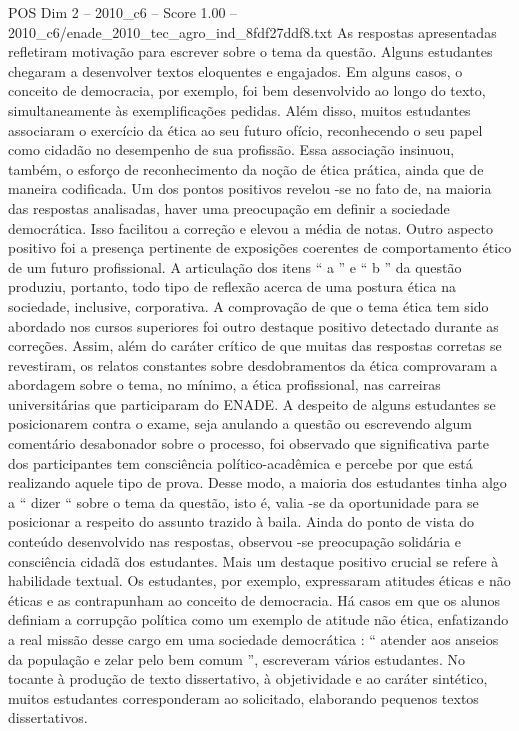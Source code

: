 \begin{textsample}{POS Dim 2 – 2010\_c6 – Score 1.00 – 2010\_c6/enade\_2010\_tec\_agro\_ind\_8fdf27ddf8.txt}
As respostas apresentadas refletiram motivação para escrever sobre o tema da questão.
Alguns estudantes chegaram a desenvolver textos eloquentes e engajados.
Em alguns casos, o conceito de democracia, por exemplo, foi bem desenvolvido ao longo do texto, simultaneamente às exemplificações pedidas.
Além disso, muitos estudantes associaram o exercício da ética ao seu futuro ofício, reconhecendo o seu papel como cidadão no desempenho de sua profissão.
Essa associação insinuou, também, o esforço de reconhecimento da noção de ética prática, ainda que de maneira codificada.
Um dos pontos positivos revelou -se no fato de, na maioria das respostas analisadas, haver uma preocupação em definir a sociedade democrática.
Isso facilitou a correção e elevou a média de notas.
Outro aspecto positivo foi a presença pertinente de exposições coerentes de comportamento ético de um futuro profissional.
A articulação dos itens “ a ” e “ b ” da questão produziu, portanto, todo tipo de reflexão acerca de uma postura ética na sociedade, inclusive, corporativa.
A comprovação de que o tema ética tem sido abordado nos cursos superiores foi outro destaque positivo detectado durante as correções.
Assim, além do caráter crítico de que muitas das respostas corretas se revestiram, os relatos constantes sobre desdobramentos da ética comprovaram a abordagem sobre o tema, no mínimo, a ética profissional, nas carreiras universitárias que participaram do ENADE.
A despeito de alguns estudantes se posicionarem contra o exame, seja anulando a questão ou escrevendo algum comentário desabonador sobre o processo, foi observado que significativa parte dos participantes tem consciência político-acadêmica e percebe por que está realizando aquele tipo de prova.
Desse modo, a maioria dos estudantes tinha algo a “ dizer “ sobre o tema da questão, isto é, valia -se da oportunidade para se posicionar a respeito do assunto trazido à baila.
Ainda do ponto de vista do conteúdo desenvolvido nas respostas, observou -se preocupação solidária e consciência cidadã dos estudantes.
Mais um destaque positivo crucial se refere à habilidade textual.
Os estudantes, por exemplo, expressaram atitudes éticas e não éticas e as contrapunham ao conceito de democracia.
Há casos em que os alunos definiam a corrupção política como um exemplo de atitude não ética, enfatizando a real missão desse cargo em uma sociedade democrática : “ atender aos anseios da população e zelar pelo bem comum ”, escreveram vários estudantes.
No tocante à produção de texto dissertativo, à objetividade e ao caráter sintético, muitos estudantes corresponderam ao solicitado, elaborando pequenos textos dissertativos.

\end{textsample}
